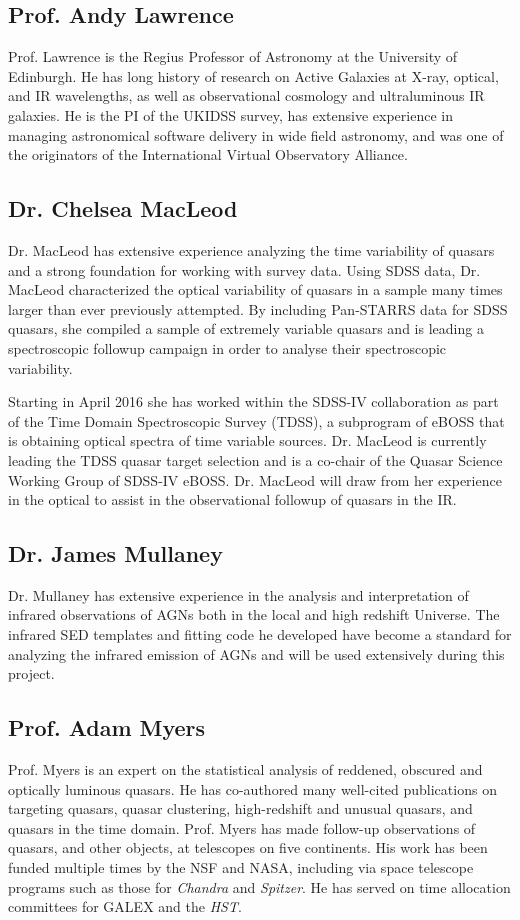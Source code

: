 \documentclass[11pt,a4paper]{article}
\begin{document}
\subsection*{Prof. Andy Lawrence}
Prof. Lawrence is the Regius Professor of Astronomy at the University
of Edinburgh. He has long history of research on Active Galaxies at
X-ray, optical, and IR wavelengths, as well as observational cosmology
and ultraluminous IR galaxies. He is the PI of the UKIDSS survey, has
extensive experience in managing astronomical software delivery in
wide field astronomy, and was one of the originators of the
International Virtual Observatory Alliance.


\subsection*{Dr. Chelsea MacLeod}
Dr. MacLeod has extensive experience analyzing the time variability of
quasars and a strong foundation for working with survey data.  Using
SDSS data, Dr. MacLeod characterized the optical variability of
quasars in a sample many times larger than ever previously attempted.
By including Pan-STARRS data for SDSS quasars, she compiled a sample
of extremely variable quasars and is leading a spectroscopic followup
campaign in order to analyse their spectroscopic variability.

\smallskip \smallskip \noindent
Starting in April 2016 she has worked within the SDSS-IV collaboration
as part of the Time Domain Spectroscopic Survey (TDSS), a subprogram
of eBOSS that is obtaining optical spectra of time variable sources.
Dr. MacLeod is currently leading the TDSS quasar target selection and
is a co-chair of the Quasar Science Working Group of SDSS-IV
eBOSS. Dr. MacLeod will draw from her experience in the optical to
assist in the observational followup of quasars in the IR.


\subsection*{Dr. James Mullaney}
Dr. Mullaney has extensive experience in the analysis and
interpretation of infrared observations of AGNs both in the local and
high redshift Universe. The infrared SED templates and fitting code he
developed have become a standard for analyzing the infrared emission
of AGNs and will be used extensively during this project.


\subsection*{Prof. Adam Myers}
Prof. Myers is an expert on the statistical analysis of reddened,
obscured and optically luminous quasars. He has co-authored many
well-cited publications on targeting quasars, quasar clustering,
high-redshift and unusual quasars, and quasars in the time
domain. Prof. Myers has made follow-up observations of quasars, and
other objects, at telescopes on five continents. His work has been
funded multiple times by the NSF and NASA, including via space
telescope programs such as those for {\it Chandra} and {\it Spitzer}. He has
served on time allocation committees for GALEX and the {\it HST}. 
\end{document}
